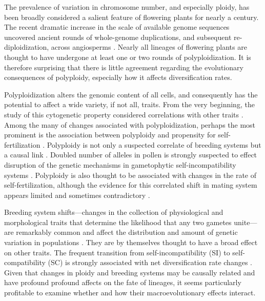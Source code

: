 The prevalence of variation in chromosome number, and especially ploidy, has been broadly considered a salient feature of flowering plants for nearly a century. %
The recent dramatic increase in the scale of available genome sequences uncovered ancient rounds of whole-genome duplications, and subsequent re-diploidization, across angiosperms \citep{lynch2000,vision2000}. 
Nearly all lineages of flowering plants are thought to have undergone at least one or two rounds of polyploidization. %
It is therefore surprising that there is little agreement regarding the evolutionary consequences of polyploidy, especially how it affects diversification rates. %

Polyploidization alters the genomic content of all cells, and consequently has the potential to affect a wide variety, if not all, traits. 
From the very beginning, the study of this cytogenetic property considered correlations with other traits \citep{stebbins1938}. 
Among the many of changes associated with polyploidization, perhaps the most prominent is the association between polyploidy and propensity for self-fertilization \citep{stebbins1950, barrett1988}.
Polyploidy is not only a suspected correlate of breeding systems but a causal link \citep{stout1942, lewis1947}.
Doubled number of alleles in pollen is strongly suspected to effect disruption of the genetic mechanisms in gametophytic self-incompatibility systems \citep{entani1999, tsukamoto2005, kubo2010}. 
Polyploidy is also thought to be associated with changes in the rate of self-fertilization, although the evidence for this correlated shift in mating system appears limited and sometimes contradictory \citep{barringer2007, barrett2008, husband2008}.

Breeding system shifts---changes in the collection of physiological and morphological traits that determine the likelihood that any two gametes unite---are remarkably common and affect the distribution and amount of genetic variation in populations \citep{stebbins1974,barrett2013}.
They are by themselves thought to have a broad effect on other traits. 
The frequent transition from self-incompatibility (SI) to self-compatibility (SC) is strongly associated with net diversification rate changes \citep{goldberg_2010,devos2014}.
Given that  changes in ploidy and breeding systems may be causally related and have profound profound affects on the fate of lineages, it seems particularly profitable to examine whether and how their macroevolutionary effects interact.
%
%


